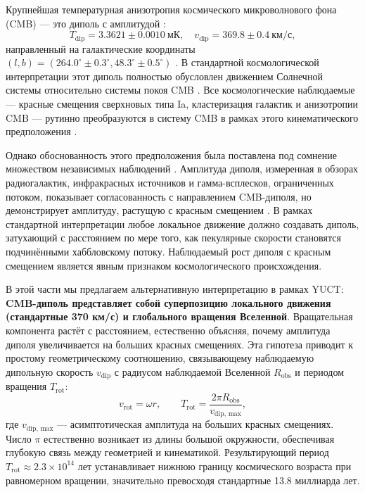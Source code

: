 \documentclass[11pt,a4paper]{article}
\begin{document}
	Крупнейшая температурная анизотропия космического микроволнового фона (CMB) — это диполь с амплитудой \cite{Planck2018VI, Planck2018VII}:
	\begin{equation}
		T_{\text{dip}} = 3.3621 \pm 0.0010\ \text{мК}, \quad v_{\text{dip}} = 369.8 \pm 0.4\ \text{км/с},
	\end{equation}
	направленный на галактические координаты \((l,b) = (264.0^\circ \pm 0.3^\circ, 48.3^\circ \pm 0.5^\circ)\) \cite{Planck2018I}. В стандартной космологической интерпретации этот диполь полностью обусловлен движением Солнечной системы относительно системы покоя CMB \cite{PlanckIntLVI}. Все космологические наблюдаемые — красные смещения сверхновых типа Ia, кластеризация галактик и анизотропии CMB — рутинно преобразуются в систему CMB в рамках этого кинематического предположения \cite{Planck2018V,Planck2018VI}.
	
	Однако обоснованность этого предположения была поставлена под сомнение множеством независимых наблюдений \cite{Gibelyou2012, Yoon2014}. Амплитуда диполя, измеренная в обзорах радиогалактик, инфракрасных источников и гамма-всплесков, ограниченных потоком, показывает согласованность с направлением CMB-диполя, но демонстрирует амплитуду, растущую с красным смещением \cite{Bengaly2017, Siewert2021, Colin2017, Secrest2025}. В рамках стандартной интерпретации любое локальное движение должно создавать диполь, затухающий с расстоянием по мере того, как пекулярные скорости становятся подчинёнными хаббловскому потоку. Наблюдаемый рост диполя с красным смещением является явным признаком космологического происхождения.
	
	В этой части мы предлагаем альтернативную интерпретацию в рамках YUCT: \textbf{CMB-диполь представляет собой суперпозицию локального движения (стандартные 370 км/с) и глобального вращения Вселенной}. Вращательная компонента растёт с расстоянием, естественно объясняя, почему амплитуда диполя увеличивается на больших красных смещениях. Эта гипотеза приводит к простому геометрическому соотношению, связывающему наблюдаемую дипольную скорость \(v_{\text{dip}}\) с радиусом наблюдаемой Вселенной \(R_{\text{obs}}\) и периодом вращения \(T_{\text{rot}}\):
	\begin{equation}
		v_{\text{rot}} = \omega r, \qquad T_{\text{rot}} = \frac{2\pi R_{\text{obs}}}{v_{\text{dip, max}}},
	\end{equation}
	где \(v_{\text{dip, max}}\) — асимптотическая амплитуда на больших красных смещениях. Число \(\pi\) естественно возникает из длины большой окружности, обеспечивая глубокую связь между геометрией и кинематикой. Результирующий период \(T_{\text{rot}} \approx 2.3 \times 10^{14}\) лет устанавливает нижнюю границу космического возраста при равномерном вращении, значительно превосходя стандартные 13.8 миллиарда лет.
	
\end{document}
